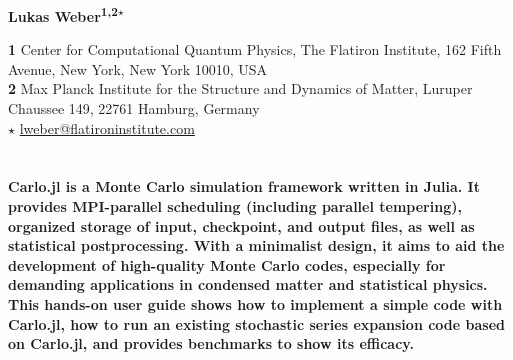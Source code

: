 \documentclass{SciPost}
\begin{document}
\pagestyle{SPstyle}

\begin{center}{\Large \textbf{\color{scipostdeepblue}{
Carlo.jl: A general framework for Monte Carlo simulations in Julia
}}}\end{center}

\begin{center}\textbf{
Lukas Weber\textsuperscript{1,2$\star$}
}\end{center}

\begin{center}
{\bf 1} Center for Computational Quantum Physics, The Flatiron Institute,
162 Fifth Avenue, New York, New York 10010, USA
\\
{\bf 2} Max Planck Institute for the Structure and Dynamics of Matter,
Luruper Chaussee 149, 22761 Hamburg, Germany
\\[\baselineskip]
$\star$ \href{mailto:lweber@flatironinstitute.com}{\small lweber@flatironinstitute.com}
\end{center}


\section*{\color{scipostdeepblue}{Abstract}}
{\boldmath\textbf{%
Carlo.jl is a Monte Carlo simulation framework written in Julia. It provides MPI-parallel scheduling (including parallel tempering), organized storage of input, checkpoint, and output files, as well as statistical postprocessing. With a minimalist design, it aims to aid the development of high-quality Monte Carlo codes, especially for demanding applications in condensed matter and statistical physics. This hands-on user guide shows how to implement a simple code with Carlo.jl, how to run an existing stochastic series expansion code based on Carlo.jl, and provides benchmarks to show its efficacy.
}}

\vspace{\baselineskip}

\noindent\textcolor{white!90!black}{%
}
\end{document}
